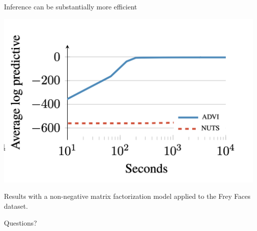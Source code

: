 \documentclass[10pt]{beamer}
\begin{document}
\begin{frame}{Inference can be substantially more efficient}
\begin{center}
\includegraphics[width=.7\textwidth]{images/NUTS_vs_ADVI} 
	
Results with a non-negative matrix factorization model applied to the Frey Faces dataset.
\end{center}	

\end{frame}



\begin{frame}[standout]
  Questions?
\end{frame}



\end{document}
